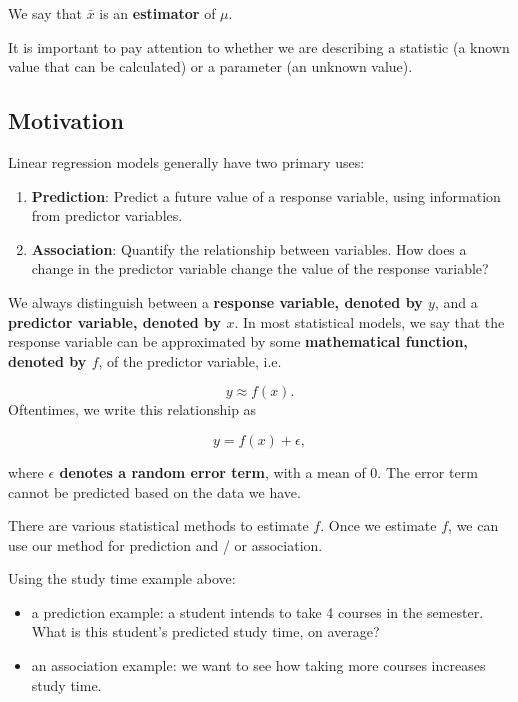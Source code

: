 \documentclass[
]{book}
\providecommand{\tightlist}{%
  \setlength{\itemsep}{0pt}\setlength{\parskip}{0pt}}
\begin{document}
We say that \(\bar{x}\) is an \textbf{estimator} of \(\mu\).

It is important to pay attention to whether we are describing a statistic (a known value that can be calculated) or a parameter (an unknown value).

\hypertarget{motivation}{%
\subsection{Motivation}\label{motivation}}

Linear regression models generally have two primary uses:

\begin{enumerate}
\def\labelenumi{\arabic{enumi}.}
\tightlist
\item
  \textbf{Prediction}: Predict a future value of a response variable, using information from predictor variables.
\item
  \textbf{Association}: Quantify the relationship between variables. How does a change in the predictor variable change the value of the response variable?
\end{enumerate}

We always distinguish between a \textbf{response variable, denoted by \(y\)}, and a \textbf{predictor variable, denoted by \(x\)}. In most statistical models, we say that the response variable can be approximated by some \textbf{mathematical function, denoted by \(f\)}, of the predictor variable, i.e.

\[
y \approx f(x).
\]
Oftentimes, we write this relationship as

\[
y = f(x) + \epsilon,
\]

where \textbf{\(\epsilon\) denotes a random error term}, with a mean of 0. The error term cannot be predicted based on the data we have.

There are various statistical methods to estimate \(f\). Once we estimate \(f\), we can use our method for prediction and / or association.

Using the study time example above:

\begin{itemize}
\tightlist
\item
  a prediction example: a student intends to take 4 courses in the semester. What is this student's predicted study time, on average?
\item
  an association example: we want to see how taking more courses increases study time.
\end{itemize}
\end{document}
